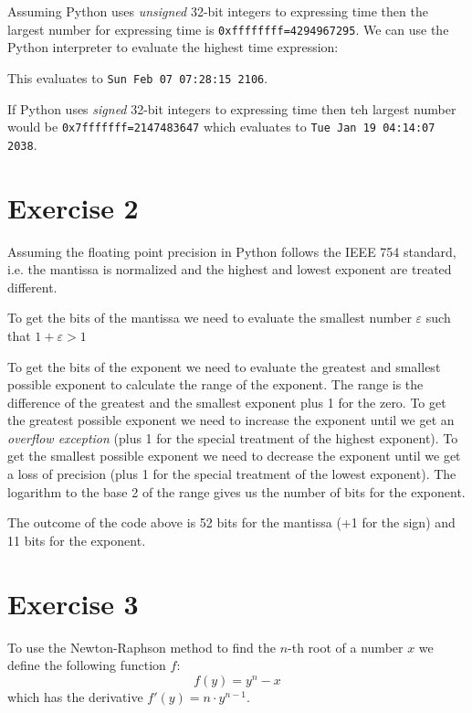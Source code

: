 \documentclass[%
]
{scrartcl}
\theoremstyle{plain}
\begin{document}
Assuming Python uses \emph{unsigned} 32-bit integers to expressing time then the largest number for expressing time is \texttt{0xffffffff=4294967295}. We can use the Python interpreter to evaluate the highest time expression:



This evaluates to \lstinline{Sun Feb 07 07:28:15 2106}.

If Python uses \emph{signed} 32-bit integers to expressing time then teh largest number would be \texttt{0x7fffffff=2147483647} which evaluates to \lstinline{Tue Jan 19 04:14:07 2038}.

\section*{Exercise 2}

Assuming the floating point precision in Python follows the IEEE 754 standard, i.e. the mantissa is normalized and the highest and lowest exponent are treated different.

To get the bits of the mantissa we need to evaluate the smallest number $\varepsilon$ such that $1+\varepsilon>1$

To get the bits of the exponent we need to evaluate the greatest and smallest possible exponent to calculate the range of the exponent. The range is the difference of the greatest and the smallest exponent plus 1 for the zero. To get the greatest possible exponent we need to increase the exponent until we get an \emph{overflow exception} (plus 1 for the special treatment of the highest exponent). To get the smallest possible exponent we need to decrease the exponent until we get a loss of precision (plus 1 for the special treatment of the lowest exponent). The logarithm to the base 2 of the range gives us the number of bits for the exponent.



The outcome of the code above is 52 bits for the mantissa (+1 for the sign) and 11 bits for the exponent.

\section*{Exercise 3}

To use the Newton-Raphson method to find the $n$-th root of a number $x$ we define the following function $f$:
\begin{equation*}
f(y)=y^{n}-x
\end{equation*}
which has the derivative $f'(y)=n\cdot y^{n-1}$.
\end{document}
